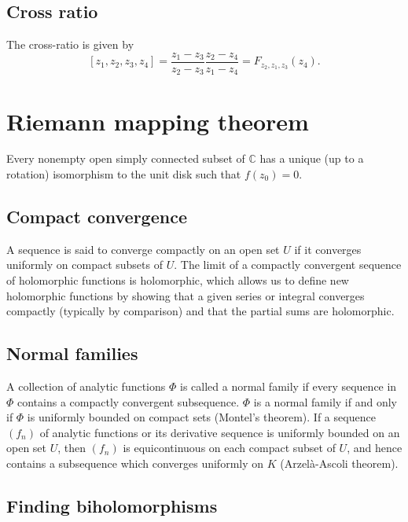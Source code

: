 \documentclass{article}
\begin{document}
\subsection{Cross ratio}
The cross-ratio is given by
$$
  [z_1, z_2, z_3, z_4]
= \frac{z_1 - z_3}
       {z_2 - z_3}
  \frac{z_2 - z_4}
       {z_1 - z_4}
= F_{z_2, z_1, z_3}(z_4).
$$


\section{Riemann mapping theorem}
Every nonempty open simply connected subset of $\mathbb{C}$ has a
unique (up to a rotation) isomorphism to the unit disk such that
$f(z_0) = 0$.

\subsection{Compact convergence}
A sequence is said to converge compactly on an open set $U$ if it
converges uniformly on compact subsets of $U$. The limit of a
compactly convergent sequence of holomorphic functions is holomorphic,
which allows us to define new holomorphic functions by showing that a
given series or integral converges compactly (typically by comparison)
and that the partial sums are holomorphic.

\subsection{Normal families}
A collection of analytic functions $\Phi$ is called a normal family if every
sequence in $\Phi$ contains a compactly convergent subsequence.
$\Phi$ is a normal family if and only if $\Phi$ is uniformly bounded
on compact sets (Montel's theorem). If a sequence $(f_n)$ of analytic
functions or its derivative sequence is uniformly bounded on an open
set $U$, then $(f_n)$ is equicontinuous on each compact subset of $U$,
and hence contains a subsequence which converges uniformly on $K$
(Arzel\`a-Ascoli theorem).

\subsection{Finding biholomorphisms}
\end{document}
